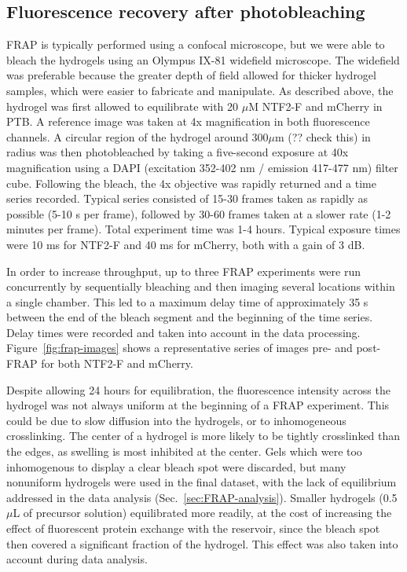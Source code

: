 \subsection{Fluorescence recovery after photobleaching}

FRAP is typically performed using a confocal microscope, but we were able to bleach the hydrogels using an Olympus IX-81 widefield microscope.  The widefield was preferable because the greater depth of field allowed for thicker hydrogel samples, which were easier to fabricate and manipulate.  As described above, the hydrogel was first allowed to equilibrate with 20 $\mu$M NTF2-F and mCherry in PTB.  A reference image was taken at 4x magnification in both fluorescence channels.  A circular region of the hydrogel around $300 \mu$m (?? check this) in radius was then photobleached by taking a five-second exposure at 40x magnification using a DAPI (excitation 352-402 nm / emission 417-477 nm) filter cube.  Following the bleach, the 4x objective was rapidly returned and a time series recorded.  Typical series consisted of 15-30 frames taken as rapidly as possible (5-10 s per frame), followed by 30-60 frames taken at a slower rate (1-2 minutes per frame).  Total experiment time was 1-4 hours.  Typical exposure times were 10 ms for NTF2-F and 40 ms for mCherry, both with a gain of 3 dB.

In order to increase throughput, up to three FRAP experiments were run concurrently by sequentially bleaching and then imaging several locations within a single chamber.  This led to a maximum delay time of approximately 35 s between the end of the bleach segment and the beginning of the time series.  Delay times were recorded and taken into account in the data processing. Figure~\ref{fig:frap-images} shows a representative series of images pre- and post-FRAP for both NTF2-F and mCherry.

Despite allowing 24 hours for equilibration, the fluorescence intensity across the hydrogel was not always uniform at the beginning of a FRAP experiment.  This could be due to slow diffusion into the hydrogels, or to inhomogeneous crosslinking.  The center of a hydrogel is more likely to be tightly crosslinked than the edges, as swelling is most inhibited at the center.  Gels which were too inhomogenous to display a clear bleach spot were discarded, but many nonuniform hydrogels were used in the final dataset, with the lack of equilibrium addressed in the data analysis (Sec.~\ref{sec:FRAP-analysis}).  Smaller hydrogels (0.5 $\mu$L of precursor solution) equilibrated more readily, at the cost of increasing the effect of fluorescent protein exchange with the reservoir, since the bleach spot then covered a significant fraction of the hydrogel.  This effect was also taken into account during data analysis.

